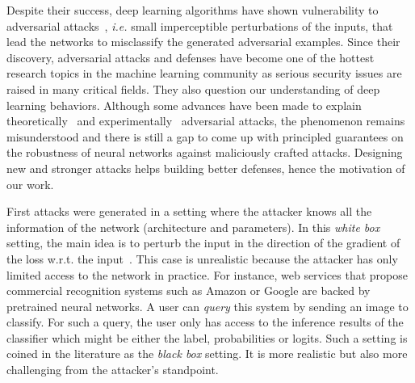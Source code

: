 Despite their success, deep learning algorithms have shown vulnerability to adversarial attacks~\citep{biggio2013evasion,Szegedy2013IntriguingPO}, \textit{i.e.} small imperceptible perturbations of the inputs, that lead the networks to misclassify the generated adversarial examples. Since their discovery, adversarial attacks and defenses have become one of the hottest research topics in the machine learning community as serious  security issues are raised in many critical fields. They also question our understanding of deep learning behaviors. Although some advances have been made to explain theoretically~\citep{Moosavi2016Robustnessofaclassifier,sinha2017certifying,KolterRandomizedSmoothing,pinot2019theoretical} and experimentally~\citep{goodfellow2014explaining,Xie2017MitigatingAE,meng2017magnet,Samangouei2018DefenseGAN,araujo2019robust} adversarial attacks, the phenomenon remains misunderstood and there is still a gap to come up with principled guarantees on the robustness of neural networks against maliciously crafted attacks. Designing new and stronger attacks helps building better defenses, hence the motivation of our work.%

First attacks were generated in a setting where the attacker knows all the information of the network (architecture and parameters). In this \textit{white box} setting, the main idea is to perturb the input in the direction of the gradient of the loss w.r.t. the input~\citep{goodfellow2014explaining,kurakin2016adversarial,carlini2017towards,moosavi2016deepfool}.  This case is unrealistic because the attacker has only limited access to the network in practice. For instance, web services that propose commercial recognition systems such as Amazon or Google are backed by pretrained neural networks. A user can \textit{query} this system by sending an  image  to classify. For such a query, the user only has access to the inference results of the classifier which might be either the label, probabilities or logits. Such a setting is coined in the literature as the \textit{black box} setting. It is more realistic but also more challenging  from the attacker's standpoint.


